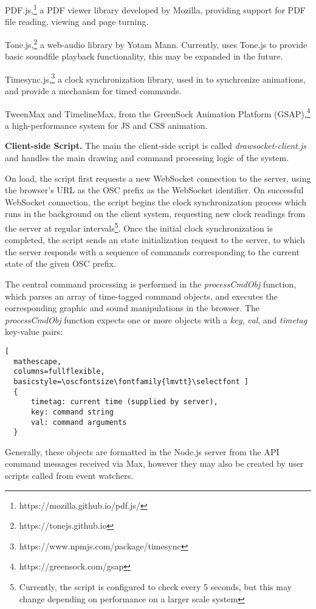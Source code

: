 {PDF.js},\footnote{https://mozilla.github.io/pdf.js/} a PDF viewer library developed by Mozilla, providing support for PDF file reading, viewing and page turning.

{Tone.js},\footnote{https://tonejs.github.io} a web-audio library by Yotam Mann. Currently, \drawsocket uses Tone.js to provide basic soundfile playback functionality, this may be expanded in the future.

{Timesync.js},\footnote{https://www.npmjs.com/package/timesync} a clock synchronization library, used in \drawsocket to synchronize animations, and provide a mechanism for timed commands.

 {TweenMax} and {TimelineMax}, from the GreenSock Animation Platform (GSAP),\footnote{https://greensock.com/gsap} a high-performance system for JS and CSS animation.
%
%

\medskip
\noindent
\textbf{Client-side Script.} 
The main the client-side script is called \textit{drawsocket-client.js} and handles the main drawing and command processing logic of the system.

On load, the script first requests a new WebSocket connection to the server, using the browser's URL as the OSC prefix as the WebSocket identifier. On successful WebSocket connection, the script begins the clock synchronization process which runs in the background on the client system, requesting new clock readings from the server at regular intervals\footnote{Currently, the script is configured to check every 5 seconds, but this may change depending on performance on a larger scale system}. Once the initial clock synchronization is completed, the script sends an state initialization request to the server, to which the server responds with a sequence of commands corresponding to the current state of the given OSC prefix.

The central command processing is performed in the \textit{processCmdObj} function, which parses an array of time-tagged command objects, and executes the corresponding graphic and sound manipulations in the browser. The \textit{processCmdObj} function expects one or more objects with a \textit{key}, \textit{val}, and \textit{timetag} key-value pairs:

\begin{lstlisting}[
  mathescape,
  columns=fullflexible,
  basicstyle=\oscfontsize\fontfamily{lmvtt}\selectfont ]
  {
      timetag: current time (supplied by server),
      key: command string
      val: command arguments
  }
\end{lstlisting}
\noindent
Generally, these objects are formatted in the Node.js server from the API command messages received via Max, however they may also be created by user scripts called from event watchers.

